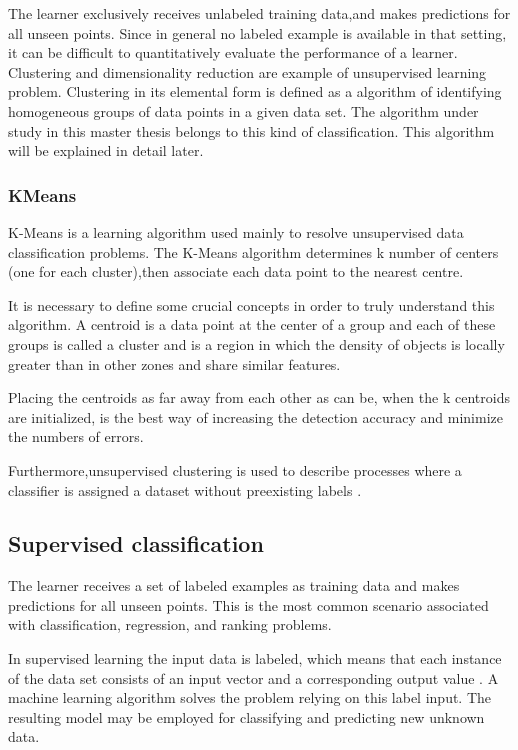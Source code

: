 	The learner exclusively receives unlabeled training data,and makes predictions for all unseen points. Since in general no labeled example is available in that setting, it can be difficult to quantitatively evaluate the performance of a learner. Clustering and dimensionality reduction are example of unsupervised learning problem\cite{mohri2012foundations}.
	Clustering in its elemental form is defined as a algorithm of identifying homogeneous groups of data points in a given data set.
	The algorithm under study in this master thesis belongs to this kind of classification. This algorithm will be explained in detail later.

    \subsubsection{KMeans} 
                   
K-Means is a learning algorithm used mainly to resolve unsupervised data classification problems. The K-Means algorithm determines k number of centers (one for each cluster),then associate each data point to the nearest centre. 

	It is necessary to define some crucial concepts in order to truly understand this algorithm. A centroid is a data point at the center of a group and each of these groups is called a cluster and is a region in which the density of objects is locally greater than in other zones and share similar features.

	Placing the centroids as far away from each other as can be, when the k centroids are initialized, is the best way of increasing the detection accuracy and minimize the numbers of errors.

 	Furthermore,unsupervised clustering is used to describe processes where a classifier is assigned a dataset without preexisting labels\cite{thomas2002randomized} \cite{kushi2012american}.
 	            
    \subsection{Supervised classification}
            	
The learner receives a set of labeled examples as training data and makes predictions for all unseen points. This is the most common scenario associated with classification, regression, and ranking problems\cite{mohri2012foundations}.

In supervised learning the input data is labeled, which means that each instance of the data set consists of an input vector and a corresponding output value \cite{mohri2012foundations}. A machine learning algorithm solves the problem relying on this label input. The resulting model may be employed for classifying and predicting new unknown data.
	
